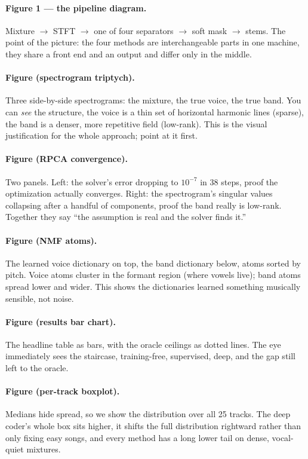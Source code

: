 \documentclass[11pt]{article}
\begin{document}
\paragraph{Figure 1 --- the pipeline diagram.} Mixture $\to$ STFT $\to$ one of four
separators $\to$ soft mask $\to$ stems. The point of the picture: the four methods
are interchangeable parts in one machine, they share a front end and an output and
differ only in the middle.

\paragraph{Figure (spectrogram triptych).} Three side-by-side spectrograms: the
mixture, the true voice, the true band. You can \emph{see} the structure, the voice
is a thin set of horizontal harmonic lines (sparse), the band is a denser, more
repetitive field (low-rank). This is the visual justification for the whole
approach; point at it first.

\paragraph{Figure (RPCA convergence).} Two panels. Left: the solver's error
dropping to $10^{-7}$ in 38 steps, proof the optimization actually converges.
Right: the spectrogram's singular values collapsing after a handful of components,
proof the band really is low-rank. Together they say ``the assumption is real and
the solver finds it.''

\paragraph{Figure (NMF atoms).} The learned voice dictionary on top, the band
dictionary below, atoms sorted by pitch. Voice atoms cluster in the formant region
(where vowels live); band atoms spread lower and wider. This shows the dictionaries
learned something musically sensible, not noise.

\paragraph{Figure (results bar chart).} The headline table as bars, with the oracle
ceilings as dotted lines. The eye immediately sees the staircase, training-free,
supervised, deep, and the gap still left to the oracle.

\paragraph{Figure (per-track boxplot).} Medians hide spread, so we show the
distribution over all 25 tracks. The deep coder's whole box sits higher, it shifts
the full distribution rightward rather than only fixing easy songs, and every method
has a long lower tail on dense, vocal-quiet mixtures.
\end{document}
